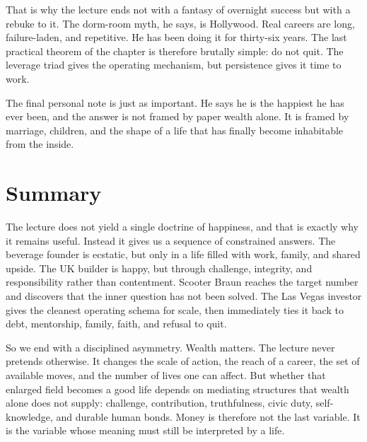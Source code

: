 That is why the lecture ends not with a fantasy of overnight success but with a rebuke to it. The dorm-room myth, he says, is Hollywood. Real careers are long, failure-laden, and repetitive. He has been doing it for thirty-six years. The last practical theorem of the chapter is therefore brutally simple: do not quit. The leverage triad gives the operating mechanism, but persistence gives it time to work.

The final personal note is just as important. He says he is the happiest he has ever been, and the answer is not framed by paper wealth alone. It is framed by marriage, children, and the shape of a life that has finally become inhabitable from the inside.

\section{Summary}

The lecture does not yield a single doctrine of happiness, and that is exactly why it remains useful. Instead it gives us a sequence of constrained answers. The beverage founder is ecstatic, but only in a life filled with work, family, and shared upside. The UK builder is happy, but through challenge, integrity, and responsibility rather than contentment. Scooter Braun reaches the target number and discovers that the inner question has not been solved. The Las Vegas investor gives the cleanest operating schema for scale, then immediately ties it back to debt, mentorship, family, faith, and refusal to quit.

So we end with a disciplined asymmetry. Wealth matters. The lecture never pretends otherwise. It changes the scale of action, the reach of a career, the set of available moves, and the number of lives one can affect. But whether that enlarged field becomes a good life depends on mediating structures that wealth alone does not supply: challenge, contribution, truthfulness, civic duty, self-knowledge, and durable human bonds. Money is therefore not the last variable. It is the variable whose meaning must still be interpreted by a life.